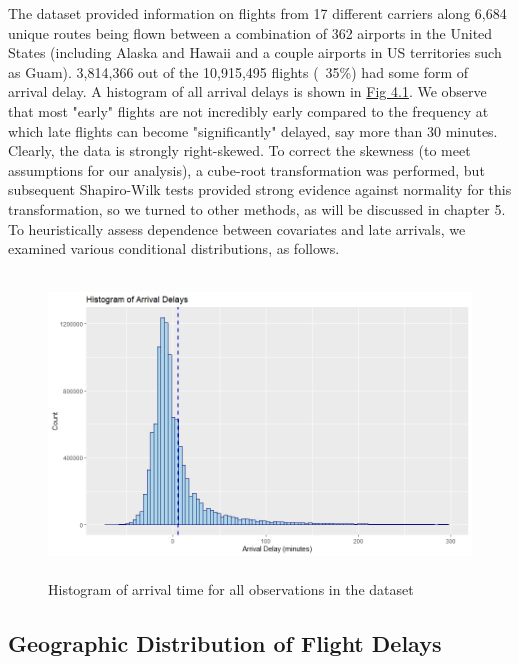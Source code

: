 \documentclass[12pt, a4paper, openany]{book}
\newcommand\tab[1][1cm]{\hspace*{#1}}
\begin{document}
	\tab The dataset provided information on flights from 17 different carriers along 6,684 unique routes being flown between a combination of 362 airports in the United States (including Alaska and Hawaii and a couple airports in US territories such as Guam). 3,814,366 out of the 10,915,495 flights (~35\%) had some form of arrival delay. A histogram of all arrival delays is shown in \underline{Fig 4.1}. We observe that most "early" flights are not incredibly early compared to the frequency at which late flights can become "significantly" delayed, say more than 30 minutes. Clearly, the data is strongly right-skewed. To correct the skewness (to meet assumptions for our analysis), a cube-root transformation was performed, but subsequent Shapiro-Wilk tests provided strong evidence against normality for this transformation, so we turned to other methods, as will be discussed in chapter 5. To heuristically assess dependence between covariates and late arrivals, we examined various conditional distributions, as follows.\\
	\begin{figure}
	\centering
	 \includegraphics[width = .5 \textwidth, height = 8cm]{../figures/PLOTS FOR REPORT/Chapter 4/Figure 4.1}
	 \caption{ Histogram of arrival time for all observations in the dataset}
	 \end{figure}
	 
		\subsection{Geographic Distribution of Flight Delays}
		
\end{document}
